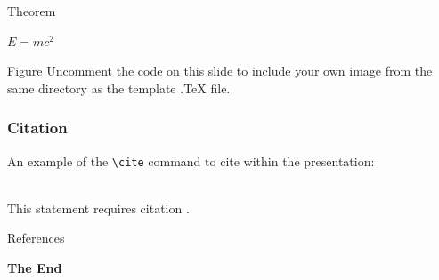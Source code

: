 \documentclass[aspectratio=169,xcolor=dvipsnames]{beamer}
\begin{document}
\begin{frame}{Theorem}
    \begin{theorem}
        $E = mc^2$
    \end{theorem}
\end{frame}


\begin{frame}{Figure}
    Uncomment the code on this slide to include your own image from the same directory as the template .TeX file.
\end{frame}


\begin{frame}[fragile] %
    \frametitle{Citation}
    An example of the \verb|\cite| command to cite within the presentation:\\~

    This statement requires citation \cite{p1}.
\end{frame}


\begin{frame}{References}
    \footnotesize
    
    
\end{frame}


\begin{frame}
    \Huge{\centerline{\textbf{The End}}}
\end{frame}

\end{document}
